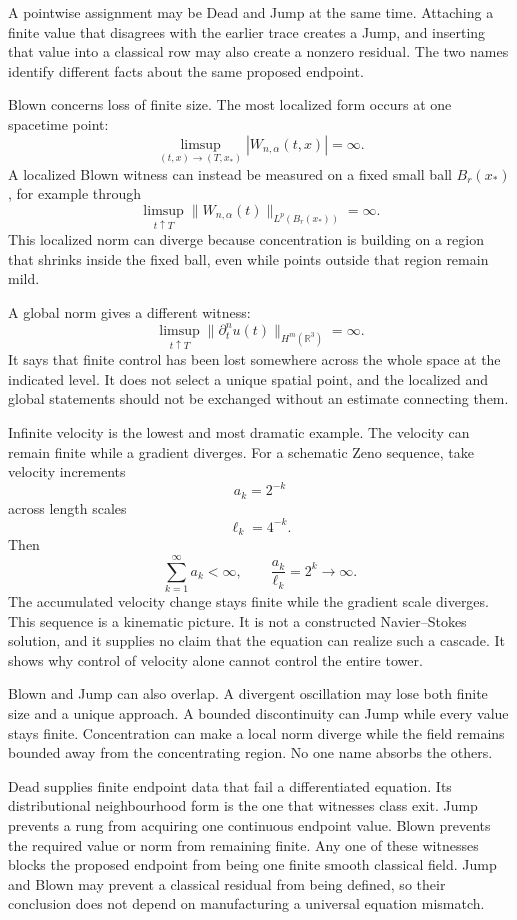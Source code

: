 A pointwise assignment may be Dead and Jump at the same time.
Attaching a finite value that disagrees with the earlier trace creates a Jump, and inserting that value into a classical row may also create a nonzero residual.
The two names identify different facts about the same proposed endpoint.


Blown concerns loss of finite size.
The most localized form occurs at one spacetime point:
\[
  \limsup_{(t,x)\to(T,x_*)}
  |W_{n,\alpha}(t,x)|
  =
  \infty.
\]
A localized Blown witness can instead be measured on a fixed small ball \(B_r(x_*)\), for example through
\[
  \limsup_{t\uparrow T}
  \|W_{n,\alpha}(t)\|_{L^p(B_r(x_*))}
  =
  \infty.
\]
This localized norm can diverge because concentration is building on a region that shrinks inside the fixed ball, even while points outside that region remain mild.

A global norm gives a different witness:
\[
  \limsup_{t\uparrow T}
  \|\partial_t^n u(t)\|_{H^m(\mathbb R^3)}
  =
  \infty.
\]
It says that finite control has been lost somewhere across the whole space at the indicated level.
It does not select a unique spatial point, and the localized and global statements should not be exchanged without an estimate connecting them.

Infinite velocity is the lowest and most dramatic example.
The velocity can remain finite while a gradient diverges.
For a schematic Zeno sequence, take velocity increments
\[
  a_k=2^{-k}
\]
across length scales
\[
  \ell_k=4^{-k}.
\]
Then
\[
  \sum_{k=1}^{\infty}a_k<\infty,
  \qquad
  \frac{a_k}{\ell_k}=2^k\longrightarrow\infty.
\]
The accumulated velocity change stays finite while the gradient scale diverges.
This sequence is a kinematic picture.
It is not a constructed Navier--Stokes solution, and it supplies no claim that the equation can realize such a cascade.
It shows why control of velocity alone cannot control the entire tower.

Blown and Jump can also overlap.
A divergent oscillation may lose both finite size and a unique approach.
A bounded discontinuity can Jump while every value stays finite.
Concentration can make a local norm diverge while the field remains bounded away from the concentrating region.
No one name absorbs the others.

Dead supplies finite endpoint data that fail a differentiated equation.
Its distributional neighbourhood form is the one that witnesses class exit.
Jump prevents a rung from acquiring one continuous endpoint value.
Blown prevents the required value or norm from remaining finite.
Any one of these witnesses blocks the proposed endpoint from being one finite smooth classical field.
Jump and Blown may prevent a classical residual from being defined, so their conclusion does not depend on manufacturing a universal equation mismatch.


